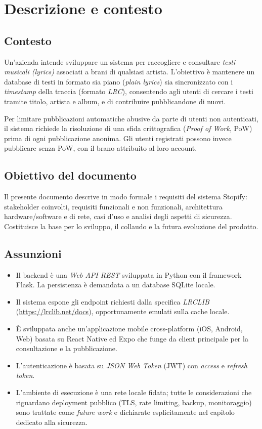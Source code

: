 \section{Descrizione e contesto}

\subsection{Contesto}
Un'azienda intende sviluppare un sistema per raccogliere e consultare \emph{testi
musicali (lyrics)} associati a brani di qualsiasi artista. L'obiettivo è mantenere
un database di testi in formato sia piano (\emph{plain lyrics}) sia sincronizzato
con i \emph{timestamp} della traccia (formato \emph{LRC}), consentendo agli utenti
di cercare i testi tramite titolo, artista e album, e di contribuire
pubblicandone di nuovi.

Per limitare pubblicazioni automatiche abusive da parte di utenti non
autenticati, il sistema richiede la risoluzione di una sfida crittografica
(\emph{Proof of Work}, PoW) prima di ogni pubblicazione anonima. Gli utenti
registrati possono invece pubblicare senza PoW, con il brano attribuito al
loro account.

\subsection{Obiettivo del documento}
Il presente documento descrive in modo formale i requisiti del sistema Stopify:
stakeholder coinvolti, requisiti funzionali e non funzionali, architettura
hardware/software e di rete, casi d'uso e analisi degli aspetti di sicurezza.
Costituisce la base per lo sviluppo, il collaudo e la futura evoluzione del
prodotto.

\subsection{Assunzioni}
\begin{itemize}
    \item Il backend è una \emph{Web API REST} sviluppata in Python con il
    framework Flask. La persistenza è demandata a un database SQLite locale.
    \item Il sistema espone gli endpoint richiesti dalla specifica
    \emph{LRCLIB} (\url{https://lrclib.net/docs}), opportunamente emulati
    sulla cache locale.
    \item È sviluppata anche un'applicazione mobile cross-platform (iOS,
    Android, Web) basata su React Native ed Expo che funge da client
    principale per la consultazione e la pubblicazione.
    \item L'autenticazione è basata su \emph{JSON Web Token} (JWT) con
    \emph{access} e \emph{refresh token}.
    \item L'ambiente di esecuzione è una rete locale fidata; tutte le
    considerazioni che riguardano deployment pubblico (TLS, rate limiting,
    backup, monitoraggio) sono trattate come \emph{future work} e dichiarate
    esplicitamente nel capitolo dedicato alla sicurezza.
\end{itemize}
